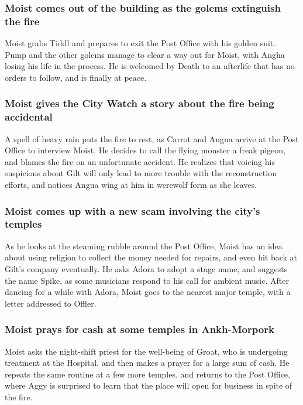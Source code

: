\subsubsection{\Gls{Moist} comes out of the building as the golems extinguish the fire}
\Gls{Moist} grabs \Gls{Tiddl} and prepares to exit the Post Office with his golden suit. \Gls{Pump}
and the other golems manage to clear a way out for \Gls{Moist}, with \Gls{Angha} losing his life in
the process. He is welcomed by \Gls{Death} to an afterlife that has no orders to follow, and is
finally at peace.

\subsubsection{\Gls{Moist} gives the City Watch a story about the fire being accidental}
A spell of heavy rain puts the fire to rest, as \Gls{Carrot} and \Gls{Angua} arrive at the Post
Office to interview \Gls{Moist}. He decides to call the flying monster a freak pigeon, and blames
the fire on an unfortunate accident. He realizes that voicing his suspicions about \Gls{Gilt} will
only lead to more trouble with the reconstruction efforts, and notices \Gls{Angua} wing at him in
werewolf form as she leaves.

\subsubsection{\Gls{Moist} comes up with a new scam involving the city's temples}
As he looks at the steaming rubble around the Post Office, \Gls{Moist} has an idea about using
religion to collect the money needed for repairs, and even hit back at \Gls{Gilt}'s company
eventually. He asks \Gls{Adora} to adopt a stage name, and suggests the name \Gls{Spike}, as some
musicians respond to his call for ambient music. After dancing for a while with \Gls{Adora},
\Gls{Moist} goes to the nearest major temple, with a letter addressed to \Gls{Offler}.

\subsubsection{\Gls{Moist} prays for cash at some temples in Ankh-Morpork}
\Gls{Moist} asks the night-shift priest for the well-being of \Gls{Groat}, who is undergoing
treatment at the Hospital, and then makes a prayer for a large sum of cash. He repeats the same
routine at a few more temples, and returns to the Post Office, where \Gls{Aggy} is surprised to
learn that the place will open for business in spite of the fire.

